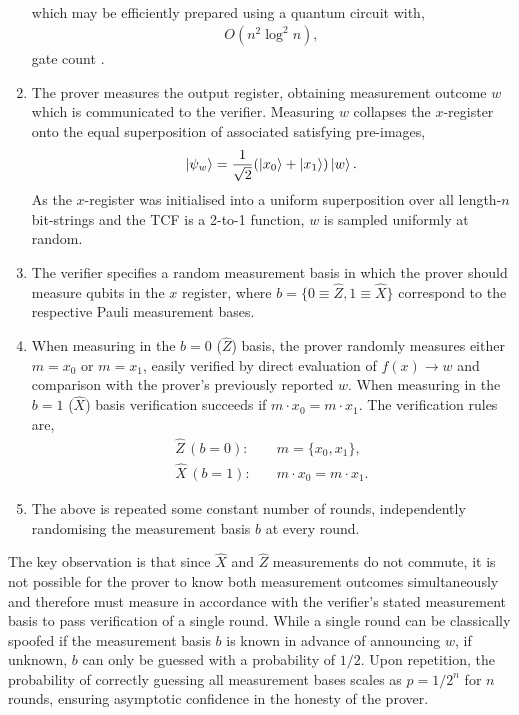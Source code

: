 \documentclass[twocolumn, aps, amsmath, amssymb, nofootinbib, superscriptaddress, longbibliography, floatfix, eqsecnum, rmp]{revtex4-2}
\begin{document}
\begin{enumerate}
\begin{align}
	\end{align}
	which may be efficiently prepared using a quantum circuit with,
	\begin{align}
		O(n^2 \log^2 n),
	\end{align}
	gate count \cite{ClassVerifQA}.
	\item The prover measures the output register, obtaining measurement outcome $w$ which is communicated to the verifier. Measuring $w$ collapses the $x$-register onto the equal superposition of associated satisfying pre-images,
\begin{align}
	\ket{\psi_w} = \frac{1}{\sqrt{2}}(\ket{x_0}+\ket{x_1})\ket{w}.
\end{align}
As the $x$-register was initialised into a uniform superposition over all length-$n$ bit-strings and the TCF is a 2-to-1 function, $w$ is sampled uniformly at random.
	\item The verifier specifies a random measurement basis in which the prover should measure qubits in the $x$ register, where $b=\{0\equiv \hat{Z},1\equiv\hat{X} \}$ correspond to the respective Pauli measurement bases.
	\item When measuring in the $b=0$ ($\hat{Z}$) basis, the prover randomly measures either $m=x_0$ or $m=x_1$, easily verified by direct evaluation of \mbox{$f(x)\to w$} and comparison with the prover's previously reported $w$. When measuring in the $b=1$ ($\hat{X}$) basis verification succeeds if \mbox{$m\cdot x_0 = m\cdot x_1$}. The verification rules are,
\begin{align}
 	\hat{Z}\, (b=0):&\quad m=\{x_0,x_1\},\nonumber\\
	\hat{X}\, (b=1):&\quad m\cdot x_0 = m\cdot x_1.
\end{align}
	\item The above is repeated some constant number of rounds, independently randomising the measurement basis $b$ at every round.
\end{enumerate}

The key observation is that since $\hat{X}$ and $\hat{Z}$ measurements do not commute, it is not possible for the prover to know both measurement outcomes simultaneously and therefore must measure in accordance with the verifier's stated measurement basis to pass verification of a single round. While a single round can be classically spoofed if the measurement basis $b$ is known in advance of announcing $w$, if unknown, $b$ can only be guessed with a probability of $1/2$. Upon repetition, the probability of correctly guessing all measurement bases scales as \mbox{$p=1/2^n$} for $n$ rounds, ensuring asymptotic confidence in the honesty of the prover.
\end{document}
